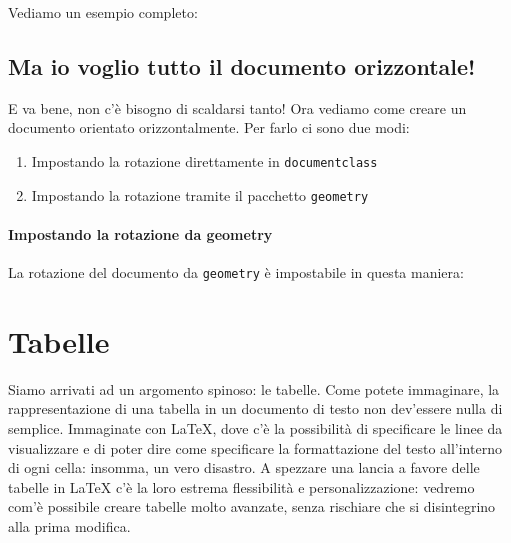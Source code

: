 \vspace{\abovedisplayskip}
\begin{minipage}{\linewidth}
  \noindent Vediamo un esempio completo:
  
\end{minipage}
\vspace{\belowdisplayskip}

\subsection{Ma io voglio tutto il documento orizzontale!}

E va bene, non c'è bisogno di scaldarsi tanto! Ora vediamo come creare un 
documento orientato orizzontalmente. Per farlo ci sono due modi:
\begin{enumerate}
 \item Impostando la rotazione direttamente in \texttt{documentclass}
 \item Impostando la rotazione tramite il pacchetto \texttt{geometry}
\end{enumerate}


\vspace{\abovedisplayskip}
\begin{minipage}{\linewidth}
  \paragraph*{Impostando la rotazione da geometry}
  
  La rotazione del documento da \texttt{geometry} è impostabile in questa 
  maniera:
  


\end{minipage}
\vspace{\belowdisplayskip}

\section{Tabelle}

Siamo arrivati ad un argomento spinoso: le tabelle. Come potete immaginare, la 
rappresentazione di una tabella in un documento di testo non dev'essere nulla 
di semplice. Immaginate con \LaTeX{}, dove c'è la possibilità di specificare le 
linee da visualizzare e di poter dire come specificare la formattazione del 
testo all'interno di ogni cella: insomma, un vero disastro.
A spezzare una lancia a favore delle tabelle in \LaTeX{} c'è la loro estrema 
flessibilità e personalizzazione: vedremo com'è possibile creare tabelle molto 
avanzate, senza rischiare che si disintegrino alla prima modifica.

